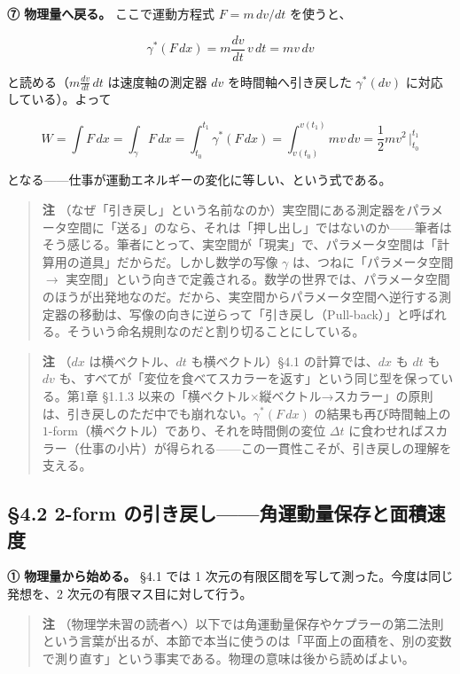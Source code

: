 \documentclass[a4paper,12pt,openany]{book}
\begin{document}
\textbf{⑦ 物理量へ戻る。} ここで運動方程式 \(F = m\,dv/dt\) を使うと、

\[\gamma^*(F\,dx) = m\frac{dv}{dt}\,v\,dt = m v\,dv\]

と読める（\(m\frac{dv}{dt}\,dt\) は速度軸の測定器 \(dv\)
を時間軸へ引き戻した \(\gamma^*(dv)\) に対応している）。よって

\[W = \int F\,dx = \int_{\gamma} F\,dx = \int_{t_0}^{t_1} \gamma^*(F\,dx) = \int_{v(t_0)}^{v(t_1)} m v\,dv = \frac{1}{2}mv^2\,\Big|_{t_0}^{t_1}\]

となる——仕事が運動エネルギーの変化に等しい、という式である。

\begin{quote}
\textbf{注}
（なぜ「引き戻し」という名前なのか）実空間にある測定器をパラメータ空間に「送る」のなら、それは「押し出し」ではないのか——筆者はそう感じる。筆者にとって、実空間が「現実」で、パラメータ空間は「計算用の道具」だからだ。しかし数学の写像
\(\gamma\) は、つねに「パラメータ空間 \(\to\)
実空間」という向きで定義される。数学の世界では、パラメータ空間のほうが出発地なのだ。だから、実空間からパラメータ空間へ逆行する測定器の移動は、写像の向きに逆らって「引き戻し（Pull-back）」と呼ばれる。そういう命名規則なのだと割り切ることにしている。
\end{quote}

\begin{quote}
\textbf{注} （\(dx\) は横ベクトル、\(dt\) も横ベクトル）§4.1
の計算では、\(dx\) も \(dt\) も \(dv\)
も、すべてが「変位を食べてスカラーを返す」という同じ型を保っている。第1章
§1.1.3
以来の「横ベクトル×縦ベクトル→スカラー」の原則は、引き戻しのただ中でも崩れない。\(\gamma^*(F\,dx)\)
の結果も再び時間軸上の
\(1\)-form（横ベクトル）であり、それを時間側の変位 \(\Delta t\)
に食わせればスカラー（仕事の小片）が得られる——この一貫性こそが、引き戻しの理解を支える。
\end{quote}

\hypertarget{form-ux306eux5f15ux304dux623bux3057ux89d2ux904bux52d5ux91cfux4fddux5b58ux3068ux9762ux7a4dux901fux5ea6}{%
\subsection{§4.2 2-form
の引き戻し——角運動量保存と面積速度}\label{form-ux306eux5f15ux304dux623bux3057ux89d2ux904bux52d5ux91cfux4fddux5b58ux3068ux9762ux7a4dux901fux5ea6}}

\textbf{① 物理量から始める。} §4.1 では 1
次元の有限区間を写して測った。今度は同じ発想を、2
次元の有限マス目に対して行う。

\begin{quote}
\textbf{注}
（物理学未習の読者へ）以下では角運動量保存やケプラーの第二法則という言葉が出るが、本節で本当に使うのは「平面上の面積を、別の変数で測り直す」という事実である。物理の意味は後から読めばよい。
\end{quote}
\end{document}
